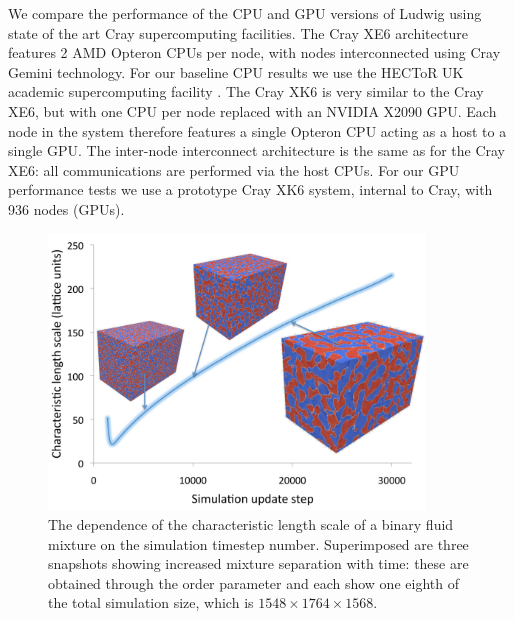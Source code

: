 We compare the performance of the CPU and GPU versions of Ludwig using
state of the art Cray supercomputing facilities. The Cray XE6
architecture \cite{xe6} features 2 AMD Opteron CPUs per node, with
nodes interconnected using Cray Gemini technology. For our baseline
CPU results we use the HECToR UK academic supercomputing facility
\cite{hector}. The Cray XK6 \cite{xk6} is very similar to the Cray
XE6, but with one CPU per node replaced with an NVIDIA X2090 GPU. Each
node in the system therefore features a single Opteron CPU acting as a
host to a single GPU. The inter-node interconnect architecture is the
same as for the Cray XE6: all communications are performed via the
host CPUs.  For our GPU performance tests we use a prototype Cray XK6
system, internal to Cray, with 936 nodes (GPUs).


\begin{figure}[!t]
\centering
\includegraphics[width=10cm]{Chapters/chapter14/figures/length_scale}
\caption{The dependence of the characteristic length scale of a binary
  fluid mixture on the simulation timestep number. Superimposed are
  three snapshots showing increased mixture separation with time:
  these are obtained through the order parameter and each show one
  eighth of the total simulation size, which is $1548\times 1764\times 1568$. }\label{ch14:fig:length_scale}
\end{figure}  

